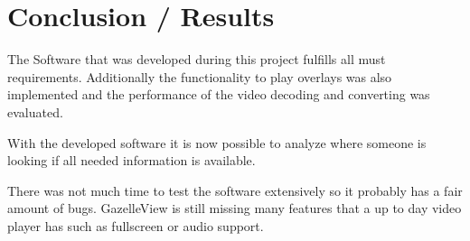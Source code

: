 \chapter{Conclusion / Results}
\label{chap:conclusions}

The Software that was developed during this project fulfills all must requirements. Additionally the functionality to play overlays was also implemented and the performance of the video decoding and converting was evaluated. 

With the developed software it is now possible to analyze where someone is looking if all needed information is available. 

There was not much time to test the software extensively so it probably has a fair amount of bugs. GazelleView is still missing many features that a up to day video player has such as fullscreen or audio support.
